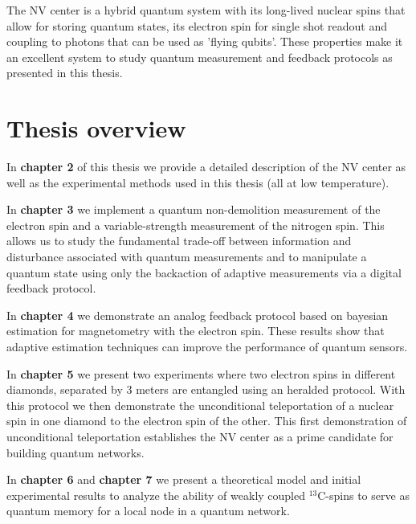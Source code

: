 The NV center is a hybrid quantum system with its long-lived nuclear spins that allow for storing quantum states, its electron spin for single shot readout and coupling to photons that can be used as 'flying qubits'. These properties make it an excellent system to study quantum measurement and feedback protocols as presented in this thesis.

\section{Thesis overview}

In \textbf{chapter 2} of this thesis we provide a detailed description of the NV center as well as the experimental methods used in this thesis (all at low temperature).

In \textbf{chapter 3} we implement a quantum non-demolition measurement of the electron spin and a variable-strength measurement of the nitrogen spin. This allows us to study the fundamental trade-off between information and disturbance associated with quantum measurements and to manipulate a quantum state using only the backaction of adaptive measurements via a digital feedback protocol.

In \textbf{chapter 4} we demonstrate an analog feedback protocol based on bayesian estimation for magnetometry with the electron spin. These results show that adaptive estimation techniques can improve the performance of quantum sensors.

In \textbf{chapter 5} we present two experiments where two electron spins in different diamonds, separated by 3 meters are entangled using an heralded protocol. With this protocol we then demonstrate the unconditional teleportation of a nuclear spin in one diamond to the electron spin of the other. This first demonstration of unconditional teleportation establishes the NV center as a prime candidate for building quantum networks.

In \textbf{chapter 6} and \textbf{chapter 7} we present a theoretical model and initial experimental results to analyze the ability of weakly coupled $^{13}$C-spins to serve as quantum memory for a local node in a quantum network.

\clearpage




